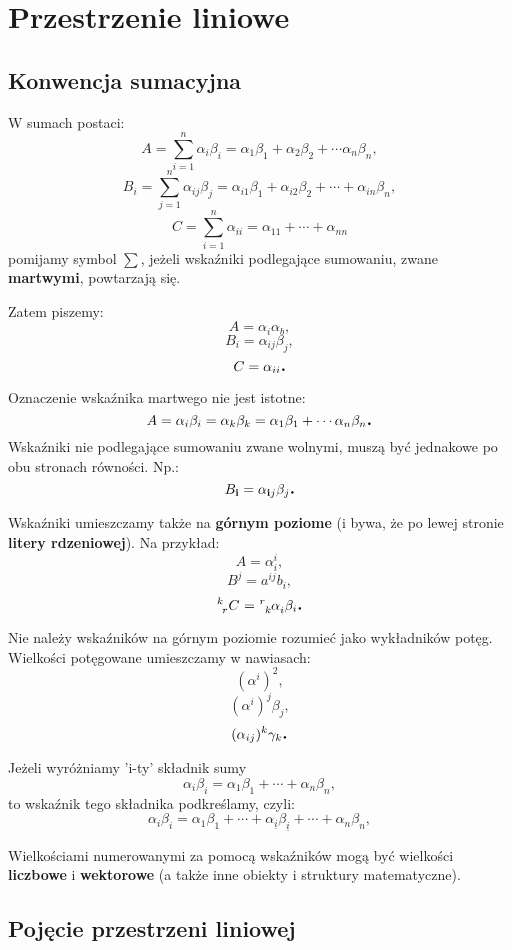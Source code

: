 \section{Przestrzenie liniowe}

\subsection{Konwencja sumacyjna}

W sumach postaci:
\[A=\sum\limits_{i=1}^{n}\alpha_i\beta_i=\alpha_1\beta_1+\alpha_2\beta_2+\cdots\alpha_n\beta_n,\]
\[B_i = \sum\limits_{j=1}^{n} \alpha_{ij}\beta_j = \alpha_{i1}\beta_1 + \alpha_{i2}\beta_2+\cdots+\alpha_{in}\beta_n,\]
\[C=\sum\limits_{i=1}^n \alpha_{ii} = \alpha_{11} + \cdots + \alpha_{nn}\]
pomijamy symbol $\sum$, jeżeli wskaźniki podlegające sumowaniu, zwane \textbf{martwymi}, powtarzają się.

Zatem piszemy:
\[A=\alpha_i\alpha_b,\]
\[B_i=\alpha_{ij}\beta_{j},\]
\[C=\alpha_{ii}\mbox{\large\bfseries .}\]

Oznaczenie wskaźnika martwego nie jest istotne:
\[A=\alpha_i\beta_i=\alpha_k\beta_k=\alpha_1\beta_1+\cdots\alpha_n\beta_n \mbox{\large\bfseries .}\]
Wskaźniki nie podlegające sumowaniu zwane wolnymi, muszą być jednakowe po obu stronach równości. Np.:
\[B_\mathbf{i} = \alpha_{\mathbf{i}j}\beta_j \mbox{\large\bfseries .}\]

Wskaźniki umieszczamy także na \textbf{górnym poziome} (i bywa, że po lewej stronie \textbf{litery rdzeniowej}). Na przykład:
\[A=\alpha_i^i,\]
\[B^j = a^{ij}b_i,\]
\[\tensor[^k_r]{C}{}= \tensor[^r_k]{\alpha}{_i}\beta_i \dend\]

Nie należy wskaźników na górnym poziomie rozumieć jako wykładników potęg.
Wielkości potęgowane umieszczamy w nawiasach:
\[(\alpha^i)^2,\]
\[(\alpha^i)^j\beta_j,\]
\[(\alpha_{ij})^k\gamma_k \mbox{\large\bfseries .}\]

Jeżeli wyróżniamy 'i-ty' składnik sumy
\[\alpha_i\beta_i = \alpha_1\beta_1+\cdots+\alpha_n\beta_n,\]
to wskaźnik tego składnika podkreślamy, czyli:
\[\alpha_i\beta_i = \alpha_1\beta_1+\cdots + \alpha_{\underline{i}} \beta_{\underline{i}}+ \cdots+\alpha_n\beta_n,\]

Wielkościami numerowanymi za pomocą wskaźników mogą być wielkości \textbf{liczbowe} i \textbf{wektorowe} (a także inne obiekty i struktury matematyczne).

\subsection{Pojęcie przestrzeni liniowej}

